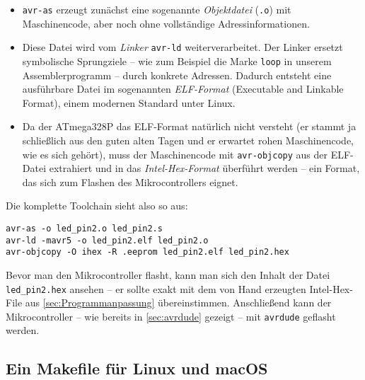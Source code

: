 \documentclass[a4paper,12pt]{article}
\begin{document}
\begin{itemize}
    \item
	\texttt{avr-as} erzeugt zunächst eine sogenannte \emph{Objektdatei}
	(\texttt{.o}) mit Maschinencode, aber noch ohne vollständige
	Adressinformationen.
    
    \item
	Diese Datei wird vom \emph{Linker} \texttt{avr-ld} weiterverarbeitet.
        Der Linker ersetzt symbolische Sprungziele – wie zum Beispiel die Marke
        \texttt{loop} in unserem Assemblerprogramm – durch konkrete Adressen.
        Dadurch entsteht eine ausführbare Datei im sogenannten
        \emph{ELF-Format} (Executable and Linkable Format), einem modernen
        Standard unter Linux.

    \item
	Da der ATmega328P das ELF-Format natürlich nicht versteht (er stammt ja
	schließlich aus den guten alten Tagen und er erwartet rohen
	Maschinencode, wie es sich gehört), muss der Maschinencode mit
	\texttt{avr-objcopy} aus der ELF-Datei extrahiert und in das
	\emph{Intel-Hex-Format} überführt werden – ein Format, das sich zum
	Flashen des Mikrocontrollers eignet.

\end{itemize}

\noindent Die komplette Toolchain sieht also so aus:

\begin{lstlisting}
avr-as -o led_pin2.o led_pin2.s
avr-ld -mavr5 -o led_pin2.elf led_pin2.o
avr-objcopy -O ihex -R .eeprom led_pin2.elf led_pin2.hex
\end{lstlisting}

\noindent
\noindent
Bevor man den Mikrocontroller flasht, kann man sich den Inhalt der Datei
\texttt{led\_pin2.hex} ansehen – er sollte exakt mit dem von Hand erzeugten
Intel-Hex-File aus \autoref{sec:Programmanpassung} übereinstimmen. Anschließend
kann der Mikrocontroller – wie bereits in \autoref{sec:avrdude} gezeigt – mit
\texttt{avrdude} geflasht werden.

\subsection{Ein Makefile für Linux und macOS}
\end{document}
